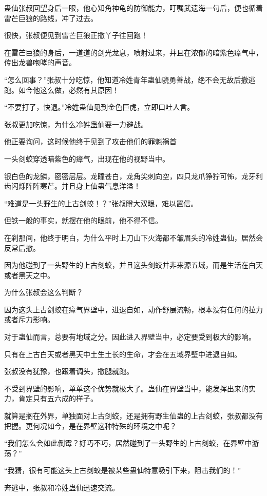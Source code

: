 \begin{this_body}
蛊仙张叔回望身后一眼，他心知角神龟的防御能力，叮嘱武遗海一句后，便也循着雷芒巨狼的路线，冲了过去。

很快，张叔便见到雷芒巨狼正撒丫子往回跑！

在雷芒巨狼的身后，一道道的剑光龙息，喷射过来，并且在浓郁的暗紫色瘴气中，传出龙兽咆哮的声音。

“怎么回事？”张叔十分吃惊，他知道冷姓青年蛊仙骁勇善战，绝不会无故后撤逃跑。如今他这么做，必然有其原因！

“不要打了，快退。”冷姓蛊仙见到金色巨虎，立即口吐人言。

张叔更加吃惊，为什么冷姓蛊仙要一力避战。

他正要询问，这时候他终于见到了攻击他们的罪魁祸首

一头剑蛟穿透暗紫色的瘴气，出现在他的视野当中。

银白色的龙鳞，密密层层。龙瞳苍白，龙角尖刺向空，四只龙爪狰狞可怖，龙牙利齿闪烁阵阵寒芒。并且身上仙蛊气息洋溢！

“难道是一头野生的上古剑蛟！？”张叔瞪大双眼，难以置信。

但铁一般的事实，就摆在他的眼前，他不得不信。

在刹那间，他终于明白，为什么平时上刀山下火海都不皱眉头的冷姓蛊仙，居然会反常后撤。

因为他碰到了一头野生的上古剑蛟，并且这头剑蛟并非来源五域，而是生活在白天或者黑天之中。

为什么张叔会这么判断？

因为这头上古剑蛟在瘴气界壁中，进退自如，动作舒展流畅，根本没有任何的拉力或者斥力影响。

对于蛊仙而言，总要有地域之分。因此进入界壁当中，必定要受到极大的影响。

只有在上古白天或者黑天中土生土长的生命，才会在五域界壁中进退自如。

张叔没有犹豫，也跟着调头，撒腿就跑。

不受到界壁的影响，单单这个优势就极大了。蛊仙在界壁当中，能发挥出来的实力，肯定只有五六成的样子。

就算是搁在外界，单独面对上古剑蛟，还是拥有野生仙蛊的上古剑蛟，张叔都没有把握。更何况如今，是在界壁这种特殊的环境之中呢？

“我们怎么会如此倒霉？好巧不巧，居然碰到了一头野生的上古剑蛟，在界壁中游荡？”

“我猜，很有可能这头上古剑蛟是被某些蛊仙特意吸引下来，阻击我们的！”

奔逃中，张叔和冷姓蛊仙迅速交流。


\end{this_body}
